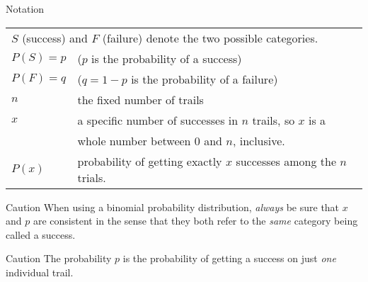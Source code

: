 \documentclass{beamer}
\newcommand{\prob}[1]{P\left(#1\right)}
\begin{document}
\begin{frame}
\begin{block}{Notation}
\begin{center}
\begin{tabular}{ll}
\multicolumn{2}{l}{$S$ (success) and $F$ (failure) denote the two possible categories.}\\\pause
$\prob{S}=p$ & ($p$ is the probability of a success) \\\pause
$\prob{F}=q$ & ($q=1-p$ is the probability of a failure) \\\pause
$n$ & the fixed number of trails\\\pause
$x$ & a specific number of successes in $n$ trails, so $x$ is a\\
& whole number between 0 and $n$, inclusive.\\\pause
$\prob{x}$ & probability of getting exactly $x$ successes among the $n$ trials.
\end{tabular}
\end{center}
\end{block}\pause

\begin{block}{Caution}
When using a binomial probability distribution, \emph{always} be sure that $x$ and $p$ are consistent in the sense that they both refer to the \emph{same} category being called a success.
\end{block}\pause

\begin{block}{Caution}
The probability $p$ is the probability of getting a success on just \emph{one} individual trail.
\end{block}
\end{frame}
\end{document}
